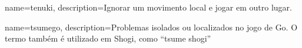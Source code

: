 \usepackage[toc]{glossaries}

\makeglossaries

{
    name=tenuki,
    description={Ignorar um movimento local e jogar em outro lugar.}
}

{
    name=tsumego,
    description={Problemas isolados ou localizados no jogo de Go. O termo também é utilizado em Shogi, como ``tsume shogi''}
}